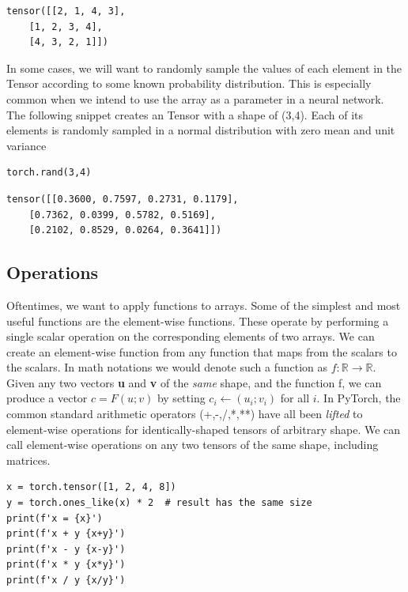 \documentclass[]{article}
\begin{document}
\begin{verbatim}
tensor([[2, 1, 4, 3],
	[1, 2, 3, 4],
	[4, 3, 2, 1]])
\end{verbatim}

In some cases, we will want to randomly sample the values of each element in the Tensor according to some known probability distribution. This is especially common when we intend to use the array as a parameter in a neural network. The following snippet creates an Tensor with a shape of (3,4). Each of its elements is randomly sampled in a normal distribution with zero mean and unit variance

\begin{verbatim}
torch.rand(3,4)
\end{verbatim}

\begin{verbatim}
tensor([[0.3600, 0.7597, 0.2731, 0.1179],
	[0.7362, 0.0399, 0.5782, 0.5169],
	[0.2102, 0.8529, 0.0264, 0.3641]])
\end{verbatim}

\subsection{Operations}

Oftentimes, we want to apply functions to arrays. Some of the simplest and most useful functions are the element-wise functions. These operate by performing a single scalar operation on the corresponding elements of two arrays. We can create an element-wise function from any function that maps from the scalars to the scalars. In math notations we would denote such a function as $ f: \mathbb{R} \rightarrow \mathbb{R} $. Given any two vectors \textbf{u} and \textbf{v} of the \textit{same} shape, and the function f, we can produce a vector $ c=F(u;v) $ by setting $ c_i \leftarrow (u_i; v_i) $ for all $ i $. In PyTorch, the common standard arithmetic operators (+,-,/,*,**) have all been \textit{lifted} to element-wise operations for identically-shaped tensors of arbitrary shape. We can call element-wise operations on any two tensors of the same shape, including matrices.

\begin{verbatim}
x = torch.tensor([1, 2, 4, 8])
y = torch.ones_like(x) * 2	# result has the same size
print(f'x = {x}')
print(f'x + y {x+y}')
print(f'x - y {x-y}')
print(f'x * y {x*y}')
print(f'x / y {x/y}')
\end{verbatim}
\end{document}
